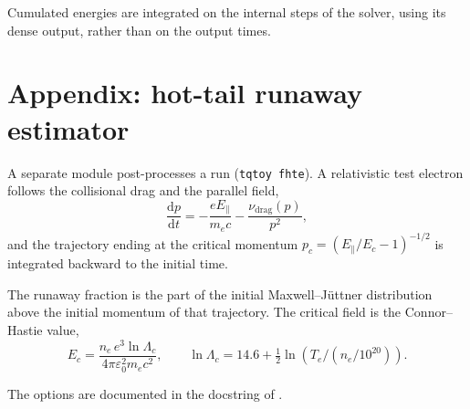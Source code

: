 \documentclass[11pt,a4paper]{article}
\newcommand{\dd}[2]{\frac{\mathrm{d}#1}{\mathrm{d}#2}}
\begin{document}
Cumulated energies are integrated on the internal steps of the solver, using its dense output,
rather than on the output times.

\section*{Appendix: hot-tail runaway estimator}

A separate module post-processes a run (\texttt{tqtoy fhte}). A relativistic test electron
follows the collisional drag and the parallel field,
\begin{equation}
  \dd{p}{t} = -\frac{e E_\parallel}{m_e c} - \frac{\nu_{\mathrm{drag}}(p)}{p^2} ,
\end{equation}
and the trajectory ending at the critical momentum
$p_c = \left(E_\parallel / E_c - 1\right)^{-1/2}$ is integrated backward to the initial time.

The runaway fraction is the part of the initial Maxwell--Jüttner distribution above the initial
momentum of that trajectory. The critical field is the Connor--Hastie value,
\begin{equation}
  E_c = \frac{n_e\, e^3 \ln\Lambda_c}{4\pi \varepsilon_0^2 m_e c^2} ,
  \qquad
  \ln\Lambda_c = 14.6 + \tfrac{1}{2} \ln\!\left( T_e / \left(n_e/10^{20}\right) \right) .
\end{equation}

The options are documented in the docstring of .
\end{document}
